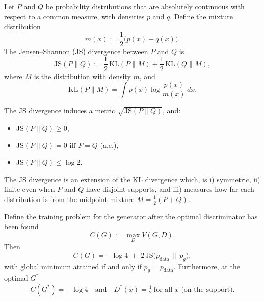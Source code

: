 \begin{definition}
Let $P$ and $Q$ be probability distributions that are absolutely continuous
with respect to a common measure, with densities $p$ and $q$.
Define the mixture distribution
\[
m(x) := \frac12\big(p(x)+q(x)\big).
\]
The Jensen--Shannon (JS) divergence between $P$ and $Q$ is
\[
\mathrm{JS}(P\|Q)
:=
\frac12\,\mathrm{KL}(P\|M)
+
\frac12\,\mathrm{KL}(Q\|M),
\]
where $M$ is the distribution with density $m$, and
\[
\mathrm{KL}(P\|M)
=
\int p(x)\log\frac{p(x)}{m(x)}\,dx.
\]
\end{definition}

\begin{remark}
The JS divergence induces a metric $\sqrt{\mathrm{JS}(P\|Q)}$, and:
\begin{itemize}
    \item $\mathrm{JS}(P\|Q) \ge 0$,
    \item $\mathrm{JS}(P\|Q)=0$ iff $P=Q$ (a.e.),
    \item $\mathrm{JS}(P\|Q) \le \log 2$.
\end{itemize}
The JS divergence is an extension of the KL divergence which, is i) symmetric, ii) finite even when $P$ and $Q$ have disjoint supports, and iii) measures how far each distribution is from the midpoint mixture $M = \tfrac12(P+Q)$.
\end{remark}


\begin{theorem}
Define the training problem for the generator after the optimal discriminator has been found
\[
C(G) := \max_D V(G,D).
\]
Then
\[
C(G) = -\log 4 \;+\; 2\,\mathrm{JS}\!\big(p_{\mathrm{data}} \,\|\, p_g\big),
\]
with global minimum attained if and only if $p_g = p_{\mathrm{data}}$. Furthermore, at the optimal $G^*$
\[
C(G^*) = -\log 4
\quad\text{and}\quad
D^*(x)=\tfrac12\ \text{for all }x \text{ (on the support).}
\]
\end{theorem}


